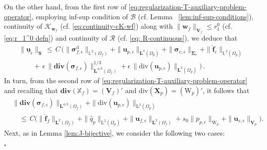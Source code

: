 \documentclass[11pt]{article}
\numberwithin{equation}{section}
\newcommand{\bsi}{{\boldsymbol\sigma}}
\newcommand{\bSigma}{{\boldsymbol\Sigma}}
\newcommand{\ubu}{\underline{\bu}}
\newcommand{\bw}{{\mathbf{w}}}
\newcommand{\f}{\mathbf{f}}
\newcommand{\bu}{\mathbf{u}}
\newcommand{\0}{{\mathbf{0}}}
\def\bX{\mathbf{X}}
\def\bV{\mathbf{V}}
\def\bS{\mathbf{S}}
\newcommand{\bL}{\mathbf{L}}
\newcommand\bbX{\mathbb{X}}
\newcommand\bbL{\mathbb{L}}
\newcommand{\cB}{\mathcal{B}}
\newcommand{\cK}{\mathcal{K}}
\newcommand{\cR}{\mathcal{R}}
\def\L{\mathrm{L}}
\def\W{\mathrm{W}}
\def\rd{\mathrm{d}}
\def\bdiv{\mathbf{div}}
\def\div{\mathrm{div}}
\def\wh{\widehat}
\newenvironment{proof}{\noindent{\it Proof.}}{\hfill$\square$}
\numberwithin{equation}{section}
\begin{document}
\begin{proof}
On the other hand, from the first row of \eqref{eq:regularization-T-auxiliary-problem-operator}, employing inf-sup condition of $\cB$ (cf. Lemma ~\ref{lem:inf-sup-conditions}), continuity of $\cK_{\bw_f}$ (cf. \eqref{eq:continuity-cK-wf}) along with $\|\bw_f\|_{\bV_f}\leq r_1^0$ (cf. \eqref{eq:r_1^0 defn}) and continuity of $\cR$ (cf. \eqref{eq: R-continuous}), we deduce that
\begin{align}
&\|\ubu_\epsilon\|_\bS
\, \leq \, C\,\Big( \|\bsi^\rd_{f,\epsilon}\|_{\bbL^2(\Omega_f)} + \|\bu_{p,\epsilon}\|_{\bL^2(\Omega_p)} + \|\bsi_{e,\epsilon}\|_{\bSigma_e} + \|\wh{\f}_e\|_{\bbL^2(\Omega_p)}  \nonumber \\ 
&\qquad +\, \epsilon\,\|\bdiv(\bsi_{f,\epsilon})\|^{1/3}_{\bL^{4/3}(\Omega_f)}
+ \epsilon\,\|\div(\bu_{p,\epsilon})\|_{\bL^2(\Omega_p)} \Big)\,.\label{eq:ubu-bound}
\end{align}
In turn, from the second row of \eqref{eq:regularization-T-auxiliary-problem-operator} and recalling that $\bdiv(\bbX_f) = (\bV_f)'$ and $\div(\bX_p) = (\W_p)'$, it follows that
\begin{align}
& \|\bdiv(\bsi_{f,\epsilon})\|_{\bL^{4/3}(\Omega_f)} + \|\div(\bu_{p,\epsilon})\|_{\L^2(\Omega_p)} \nonumber \\ 
&\quad \leq\, C\Big(\|\wh{\f}_f\|_{\bL^2(\Omega_f)} + \|\wh{q}_p\|_{\L^2(\Omega_p)} + \|\bu_{f,\epsilon}\|_{\bL^2(\Omega_f)} + s_0\|p_{p,\epsilon}\|_{\W_p} + \|\bu_{s,\epsilon}\|_{\bV_p} \Big).\label{eq:bound-solution-data-2a}
\end{align}
Next, as in Lemma \ref{lem:J-bijective}, we consider the following two cases:


\end{proof}
\end{document}
